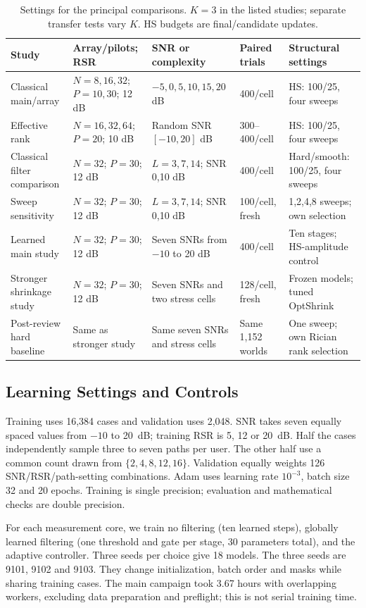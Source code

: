 \documentclass[10pt,journal,letterpaper]{IEEEtran}
\begin{document}
\begin{table}[!t]
\caption{Settings for the principal comparisons. $K=3$ in the listed studies; separate transfer tests vary $K$. HS budgets are final/candidate updates.}
\label{tab:settings}\centering\footnotesize
\begin{tabular}{@{}p{1.13in}p{1.33in}p{1.27in}p{0.90in}p{1.16in}@{}}\toprule
Study & Array/pilots; RSR & SNR or complexity & Paired trials & Structural settings\\\midrule
Classical main/array & $N=8,16,32$; $P=10,30$; 12 dB & $-5,0,5,10,15,20$ dB & 400/cell & HS: 100/25, four sweeps\\
Effective rank & $N=16,32,64$; $P=20$; 10 dB & Random SNR $[-10,20]$ dB & 300--400/cell & HS: 100/25, four sweeps\\
Classical filter comparison & $N=32$; $P=30$; 12 dB & $L=3,7,14$; SNR 0,10 dB & 400/cell & Hard/smooth: 100/25, four sweeps\\
Sweep sensitivity & $N=32$; $P=30$; 12 dB & $L=3,7,14$; SNR 0,10 dB & 100/cell, fresh & 1,2,4,8 sweeps; own selection\\
Learned main study & $N=32$; $P=30$; 12 dB & Seven SNRs from $-10$ to 20 dB & 400/cell & Ten stages; HS-amplitude control\\
Stronger shrinkage study & $N=32$; $P=30$; 12 dB & Seven SNRs and two stress cells & 128/cell, fresh & Frozen models; tuned OptShrink\\
Post-review hard baseline & Same as stronger study & Same seven SNRs and stress cells & Same 1,152 worlds & One sweep; own Rician rank selection\\\bottomrule
\end{tabular}
\end{table}

\subsection{Learning Settings and Controls}
Training uses 16,384 cases and validation uses 2,048. SNR takes seven equally spaced values from $-10$ to 20~dB; training RSR is 5, 12 or 20~dB. Half the cases independently sample three to seven paths per user. The other half use a common count drawn from $\{2,4,8,12,16\}$. Validation equally weights 126 SNR/RSR/path-setting combinations. Adam uses learning rate $10^{-3}$, batch size 32 and 20 epochs. Training is single precision; evaluation and mathematical checks are double precision.

For each measurement core, we train no filtering (ten learned steps), globally learned filtering (one threshold and gate per stage, 30 parameters total), and the adaptive controller. Three seeds per choice give 18 models. The three seeds are 9101, 9102 and 9103. They change initialization, batch order and masks while sharing training cases. The main campaign took 3.67 hours with overlapping workers, excluding data preparation and preflight; this is not serial training time.
\end{document}
